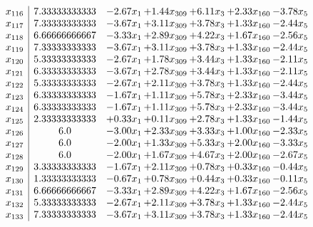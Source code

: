 \documentclass[8pt]{article}
\begin{document}
\[\begin{array}{c| c c@{\hskip 2pt} c@{\hskip 2pt} c@{\hskip 2pt} c@{\hskip 2pt} c@{\hskip 2pt} }
 x_{116}   &  7.33333333333 & -2.67 x_{1} & +  1.44 x_{309} & +  6.11 x_{3} & +  2.33 x_{160} & -3.78 x_{5}\\
 x_{117}   &  7.33333333333 & -3.67 x_{1} & +  3.11 x_{309} & +  3.78 x_{3} & +  1.33 x_{160} & -2.44 x_{5}\\
 x_{118}   &  6.66666666667 & -3.33 x_{1} & +  2.89 x_{309} & +  4.22 x_{3} & +  1.67 x_{160} & -2.56 x_{5}\\
 x_{119}   &  7.33333333333 & -3.67 x_{1} & +  3.11 x_{309} & +  3.78 x_{3} & +  1.33 x_{160} & -2.44 x_{5}\\
 x_{120}   &  5.33333333333 & -2.67 x_{1} & +  1.78 x_{309} & +  3.44 x_{3} & +  1.33 x_{160} & -2.11 x_{5}\\
 x_{121}   &  6.33333333333 & -3.67 x_{1} & +  2.78 x_{309} & +  3.44 x_{3} & +  1.33 x_{160} & -2.11 x_{5}\\
 x_{122}   &  5.33333333333 & -2.67 x_{1} & +  2.11 x_{309} & +  3.78 x_{3} & +  1.33 x_{160} & -2.44 x_{5}\\
 x_{123}   &  6.33333333333 & -1.67 x_{1} & +  1.11 x_{309} & +  5.78 x_{3} & +  2.33 x_{160} & -3.44 x_{5}\\
 x_{124}   &  6.33333333333 & -1.67 x_{1} & +  1.11 x_{309} & +  5.78 x_{3} & +  2.33 x_{160} & -3.44 x_{5}\\
 x_{125}   &  2.33333333333 & +  0.33 x_{1} & +  0.11 x_{309} & +  2.78 x_{3} & +  1.33 x_{160} & -1.44 x_{5}\\
 x_{126}   &  6.0 & -3.00 x_{1} & +  2.33 x_{309} & +  3.33 x_{3} & +  1.00 x_{160} & -2.33 x_{5}\\
 x_{127}   &  6.0 & -2.00 x_{1} & +  1.33 x_{309} & +  5.33 x_{3} & +  2.00 x_{160} & -3.33 x_{5}\\
 x_{128}   &  6.0 & -2.00 x_{1} & +  1.67 x_{309} & +  4.67 x_{3} & +  2.00 x_{160} & -2.67 x_{5}\\
 x_{129}   &  3.33333333333 & -1.67 x_{1} & +  2.11 x_{309} & +  0.78 x_{3} & +  0.33 x_{160} & -0.44 x_{5}\\
 x_{130}   &  1.33333333333 & -0.67 x_{1} & +  0.78 x_{309} & +  0.44 x_{3} & +  0.33 x_{160} & -0.11 x_{5}\\
 x_{131}   &  6.66666666667 & -3.33 x_{1} & +  2.89 x_{309} & +  4.22 x_{3} & +  1.67 x_{160} & -2.56 x_{5}\\
 x_{132}   &  5.33333333333 & -2.67 x_{1} & +  2.11 x_{309} & +  3.78 x_{3} & +  1.33 x_{160} & -2.44 x_{5}\\
 x_{133}   &  7.33333333333 & -3.67 x_{1} & +  3.11 x_{309} & +  3.78 x_{3} & +  1.33 x_{160} & -2.44 x_{5}\\

\end{array}\]
\end{document}
